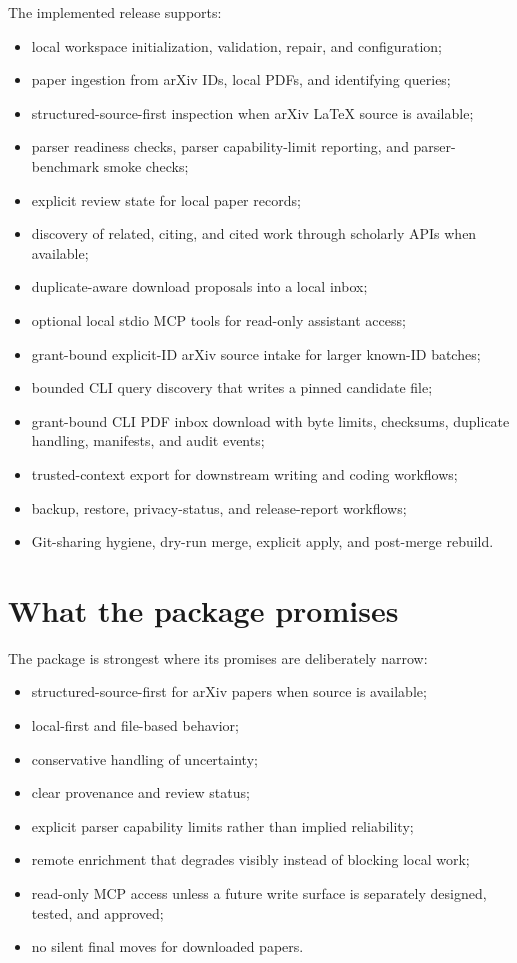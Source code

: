 \documentclass[11pt,a4paper,openany]{book}
\begin{document}
The implemented release supports:
\begin{itemize}[nosep]
  \item local workspace initialization, validation, repair, and configuration;
  \item paper ingestion from arXiv IDs, local PDFs, and identifying queries;
  \item structured-source-first inspection when arXiv LaTeX source is available;
  \item parser readiness checks, parser capability-limit reporting, and
        parser-benchmark smoke checks;
  \item explicit review state for local paper records;
  \item discovery of related, citing, and cited work through scholarly APIs when
        available;
  \item duplicate-aware download proposals into a local inbox;
  \item optional local stdio MCP tools for read-only assistant access;
  \item grant-bound explicit-ID arXiv source intake for larger known-ID batches;
  \item bounded CLI query discovery that writes a pinned candidate file;
  \item grant-bound CLI PDF inbox download with byte limits, checksums,
        duplicate handling, manifests, and audit events;
  \item trusted-context export for downstream writing and coding workflows;
  \item backup, restore, privacy-status, and release-report workflows;
  \item Git-sharing hygiene, dry-run merge, explicit apply, and post-merge
        rebuild.
\end{itemize}

\section{What the package promises}

The package is strongest where its promises are deliberately narrow:
\begin{itemize}[nosep]
  \item structured-source-first for arXiv papers when source is available;
  \item local-first and file-based behavior;
  \item conservative handling of uncertainty;
  \item clear provenance and review status;
  \item explicit parser capability limits rather than implied reliability;
  \item remote enrichment that degrades visibly instead of blocking local work;
  \item read-only MCP access unless a future write surface is separately
        designed, tested, and approved;
  \item no silent final moves for downloaded papers.
\end{itemize}
\end{document}
